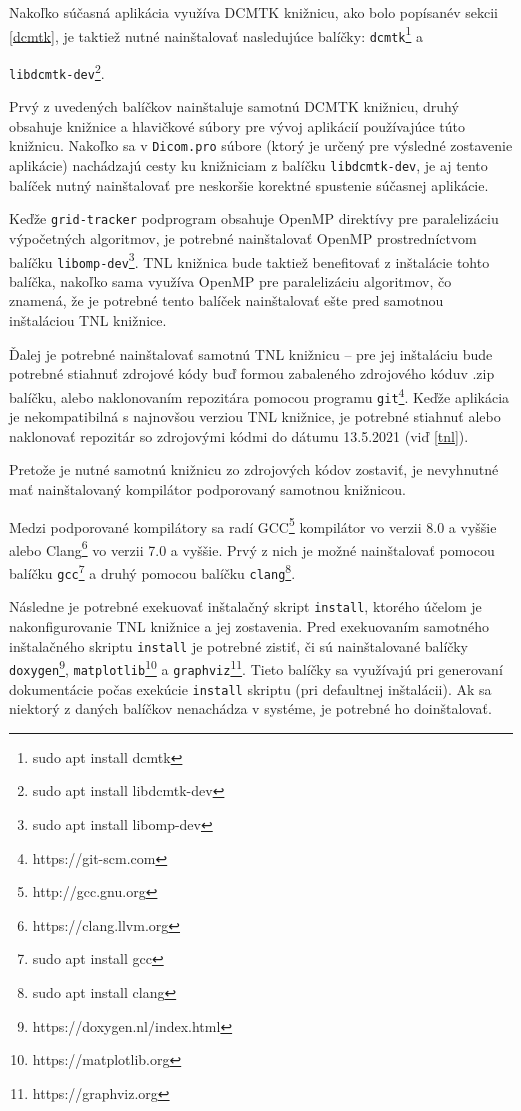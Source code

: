 Nakoľko súčasná aplikácia využíva DCMTK knižnicu, ako bolo popísané\newline v sekcii \ref{dcmtk}, je taktiež nutné nainštalovať nasledujúce balíčky: \texttt{dcmtk}\footnote{sudo apt install dcmtk} \newline a {\texttt{libdcmtk-dev}\footnote{sudo apt install libdcmtk-dev}.

Prvý z uvedených balíčkov nainštaluje samotnú DCMTK knižnicu, druhý obsahuje knižnice a hlavičkové súbory pre vývoj aplikácií používajúce túto knižnicu. Nakoľko sa v \texttt{Dicom.pro} súbore (ktorý je určený pre výsledné zostavenie aplikácie) nachádzajú cesty ku knižniciam z balíčku \texttt{libdcmtk-dev}, je aj tento balíček nutný nainštalovať pre neskoršie korektné spustenie súčasnej aplikácie.

Keďže \texttt{grid-tracker} podprogram obsahuje OpenMP direktívy pre paralelizáciu výpočetných algoritmov, je potrebné nainštalovať OpenMP prostredníctvom balíčku \texttt{libomp-dev}\footnote{sudo apt install libomp-dev}. TNL knižnica bude taktiež benefitovať z inštalácie tohto balíčka, nakoľko sama využíva OpenMP pre paralelizáciu algoritmov, čo znamená, že je potrebné tento balíček nainštalovať ešte pred samotnou inštaláciou TNL knižnice.

Ďalej je potrebné nainštalovať samotnú TNL knižnicu -- pre jej inštaláciu bude potrebné stiahnuť zdrojové kódy buď formou zabaleného zdrojového kódu\newline v .zip balíčku, alebo naklonovaním repozitára pomocou programu \texttt{git}\footnote{https://git-scm.com}. Keďže aplikácia je nekompatibilná s najnovšou verziou TNL knižnice, je potrebné stiahnuť alebo naklonovať repozitár so zdrojovými kódmi do dátumu 13.5.2021 (viď \ref{tnl}).

Pretože je nutné samotnú knižnicu zo zdrojových kódov zostaviť, je nevyhnutné mať nainštalovaný kompilátor podporovaný samotnou knižnicou.

Medzi podporované kompilátory sa radí GCC\footnote{http://gcc.gnu.org} kompilátor vo verzii 8.0 a vyššie alebo Clang\footnote{https://clang.llvm.org} vo verzii 7.0 a vyššie. Prvý z nich je možné nainštalovať pomocou balíčku \texttt{gcc}\footnote{sudo apt install gcc} a druhý pomocou balíčku \texttt{clang}\footnote{sudo apt install clang}.

Následne je potrebné exekuovať inštalačný skript \texttt{install}, ktorého účelom je nakonfigurovanie TNL knižnice a jej zostavenia.
Pred exekuovaním samotného inštalačného skriptu \texttt{install} je potrebné zistiť, či sú nainštalované balíčky \texttt{doxygen}\footnote{https://doxygen.nl/index.html}, \texttt{matplotlib}\footnote{https://matplotlib.org} a \texttt{graphviz}\footnote{https://graphviz.org}. Tieto balíčky sa využívajú pri generovaní dokumentácie počas exekúcie \texttt{install} skriptu (pri defaultnej inštalácii). Ak sa niektorý z daných balíčkov nenachádza v systéme, je potrebné ho doinštalovať.

}
